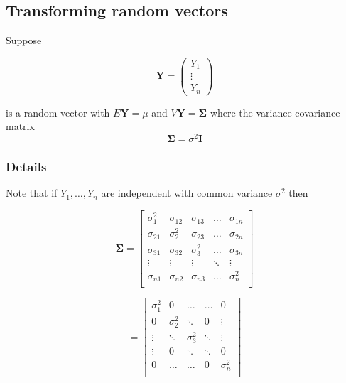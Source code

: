 \documentclass[12pt,a4paper]{article}
\theoremstyle{regla}
\theoremstyle{remark}
\theoremstyle{definition}
\theoremstyle{nonumberbreak}
\begin{document}
\subsection{Transforming random vectors}
\begin{fbox}
\begin{minipage}{0.97\textwidth}
Suppose 

\[\mathbf{Y}
=
\left(
\begin{array}{c}
Y_1\\
\vdots \\
Y_n
\end{array} \right)\]

is a random vector with $E \mathbf{Y} = \mu$ and $V \mathbf{Y} = \boldsymbol{\Sigma} $ where the variance-covariance matrix 
$$ \boldsymbol{\Sigma} = \sigma^2 \mathbf{I} $$
\end{minipage}
\end{fbox}
\subsubsection{Details}
Note that if $Y_1, \ldots, Y_n$ are independent with common variance $\sigma^2$ then

\[
\boldsymbol{\Sigma}
=
\left[
\begin{array}{ccccc}
\sigma_{1}^{2} & \sigma_{12} & \sigma_{13} & \ldots & \sigma_{1n} \\
\sigma_{21} & \sigma_2^{2} & \sigma_{23} & \ldots & \sigma_{2n} \\
\sigma_{31} &\sigma_{32}  &\sigma_3^{2}  & \ldots & \sigma_{3n}\\
\vdots & \vdots & \vdots & \ddots & \vdots \\
\sigma_{n1} & \sigma_{n2} & \sigma_{n3} & \ldots & \sigma_n^{2}\\ 
\end{array} \right]
\]




\[
 =
\left[
\begin{array}{ccccc}
\sigma_{1}^{2} & 0 & \ldots & \ldots & 0 \\
 0 & \sigma_2^{2} & \ddots & 0  & \vdots \\
 \vdots & \ddots  &\sigma_3^{2}  & \ddots & \vdots \\
\vdots & 0 & \ddots & \ddots & 0 \\
0 & \ldots & \ldots & 0 & \sigma_n^{2}\\ 
\end{array} \right]\]
\end{document}
